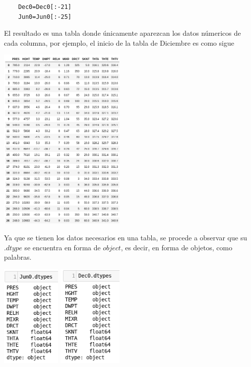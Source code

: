 \documentclass{article}
\begin{document}
    \begin{verbatim}
    Dec0=Dec0[:-21]
    Jun0=Jun0[:-25]
	\end{verbatim}
    
    El resultado es una tabla donde únicamente aparezcan los datos númericos de cada columna, por ejemplo, el inicio de la tabla de Diciembre es como sigue
    
    \begin{center}
    \includegraphics[height=9cm]{TablaDec.png}
    \end{center}
    
    Ya que se tienen los datos necesarios en una tabla, se procede a observar que su $.dtype$ se encuentra en forma de $object$, es decir, en forma de objetos, como palabras. 
    
    \begin{center}
    \includegraphics[height=5cm]{JunTypeObj.png}
    \includegraphics[height=5cm]{dectypeobj.png}
    \end{center}
    
\end{document}
